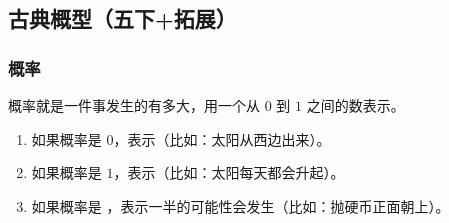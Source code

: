 \subsection*{古典概型（五下+拓展）}
\subsubsection*{概率}
概率就是一件事发生的有多大，用一个从 $0$ 到 $1$ 之间的数表示。

\begin{enumerate}
    \item 如果概率是 $0$，表示（比如：太阳从西边出来）。
    \item 如果概率是 $1$，表示（比如：太阳每天都会升起）。
    \item 如果概率是 ，表示一半的可能性会发生（比如：抛硬币正面朝上）。
\end{enumerate}

